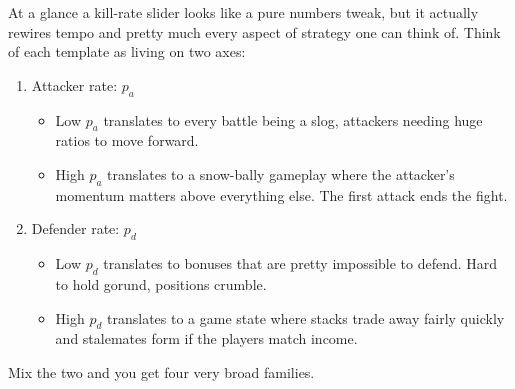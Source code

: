 At a glance a kill-rate slider looks like a pure numbers tweak, but it actually rewires tempo and pretty much every aspect of strategy one can think of. Think of each template as living on two axes:
\begin{enumerate}
    \item Attacker rate: $p_a$
    \begin{itemize}
        \item Low $p_a$ translates to every battle being a slog, attackers needing huge ratios to move forward. 
        \item High $p_a$ translates to a snow-bally gameplay where the attacker's momentum matters above everything else. The first attack ends the fight.
    \end{itemize}
    \item Defender rate: $p_d$
    \begin{itemize}
        \item Low $p_d$ translates to bonuses that are pretty impossible to defend. Hard to hold gorund, positions crumble.
        \item High $p_d$ translates to a game state where stacks trade away fairly quickly and stalemates form if the players match income.
    \end{itemize}
\end{enumerate}

Mix the two and you get four very broad families.

